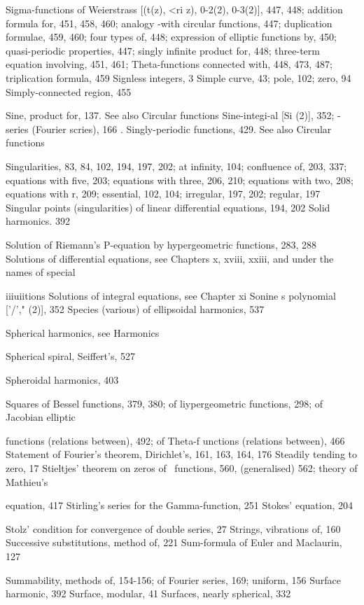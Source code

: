 Sigma-functions of Weierstrass [(t(z), <ri z), 0-2(2), 0-3(2)], 447, 448; addition formula for, 451,
458, 460; analogy -with circular functions, 447; duplication formulae, 459, 460; four
types of, 448; expression of elliptic functions by, 450; quasi-periodic properties, 447;
singly infinite product for, 448; three-term equation involving, 451, 461; Theta-functions
connected with, 448, 473, 487; triplication formula, 459
Signless integers, 3
Simple curve, 43; pole, 102; zero, 94
Simply-connected region, 455

Sine, product for, 137. See also Circular functions
Sine-integi-al [Si (2)], 352; -series (Fourier scries), 166 .
Singly-periodic functions, 429. See also Circular functions

Singularities, 83, 84, 102, 194, 197, 202; at infinity, 104; confluence of, 203, 337; equations
with five, 203; equations with three, 206, 210; equations with two, 208; equations with r,
209; essential, 102, 104; irregular, 197, 202; regular, 197
Singular points (singularities) of linear differential equations, 194, 202
Solid harmonics. 392

Solution of Riemann's P-equation by hypergeometric functions, 283, 288
Solutions of differential equations, see Chapters x, xviii, xxiii, and under the names of special

iiiuiitions
Solutions of integral equations, see Chapter xi
Sonine s polynomial ['/'," (2)], 352
Species (various) of ellipsoidal harmonics, 537

%
%

Spherical harmonics, see Harmonics

Spherical spiral, Seiffert's, 527

Spheroidal harmonics, 403

Squares of Bessel functions, 379, 380; of liypergeometric functions, 298; of Jacobian elliptic

functions (relations between), 492; of Theta-f unctions (relations between), 466
Statement of Fourier's theorem, Dirichlet's, 161, 163, 164, 176
Steadily tending to zero, 17
Stieltjes' theorem on zeros of \Lame\ functions, 560, (generalised) 562; theory of Mathieu's

equation, 417
Stirling's series for the Gamma-function, 251
Stokes' equation, 204

Stolz' condition for convergence of double series, 27
Strings, vibrations of, 160
Successive substitutions, method of, 221
Sum-formula of Euler and Maclaurin, 127

Summability, methods of, 154-156; of Fourier series, 169; uniform, 156
Surface harmonic, 392
Surface, modular, 41
Surfaces, nearly spherical, 332

